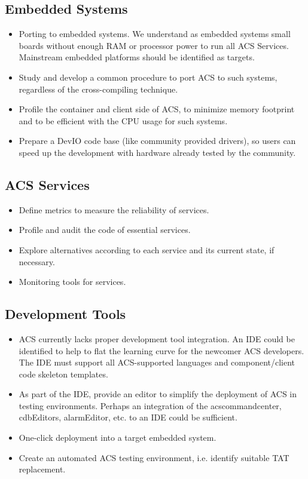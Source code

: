 \documentclass[letterpaper,11pt,twosided]{article}
\begin{document}
\subsection{Embedded Systems}
\begin{itemize}
\item Porting to embedded systems. We understand as embedded systems small boards without enough RAM or processor power to run all ACS Services. Mainstream embedded platforms should be identified as targets.
\item Study and develop a common procedure to port ACS to such systems, regardless of the cross-compiling technique.
\item Profile the container and client side of ACS, to minimize memory footprint and to be efficient with the CPU usage for such systems.
\item Prepare a DevIO code base (like community provided drivers), so users can speed up the development with hardware already tested by the community.
\end{itemize}

\subsection{ACS Services}
\begin{itemize}
\item Define metrics to measure the reliability of services.
\item Profile and audit the code of essential services.
\item Explore alternatives according to each service and its current state, if necessary.
\item Monitoring tools for services.
\end{itemize}

\subsection{Development Tools}
\begin{itemize}
\item ACS currently lacks proper development tool integration. An IDE could be identified to help to flat the learning curve for the newcomer ACS developers. The IDE must support all ACS-supported languages and component/client code skeleton templates.
\item As part of the IDE, provide an editor to simplify the deployment of ACS in testing environments. Perhaps an integration of the acscommandcenter, cdbEditors, alarmEditor, etc. to an IDE could be sufficient.
\item One-click deployment into a target embedded system.
\item Create an automated ACS testing environment, i.e. identify suitable TAT replacement.
\end{itemize}
\end{document}
